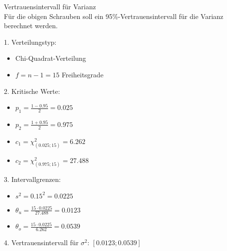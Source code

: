 \begin{example2}{Vertrauensintervall für Varianz}\\
Für die obigen Schrauben soll ein 95\%-Vertrauensintervall für die Varianz berechnet werden.

1. Verteilungstyp:
   \begin{itemize}
     \item Chi-Quadrat-Verteilung
     \item $f = n-1 = 15$ Freiheitsgrade
   \end{itemize}

2. Kritische Werte:
   \begin{itemize}
     \item $p_1 = \frac{1-0.95}{2} = 0.025$
     \item $p_2 = \frac{1+0.95}{2} = 0.975$
     \item $c_1 = \chi^2_{(0.025;15)} = 6.262$
     \item $c_2 = \chi^2_{(0.975;15)} = 27.488$
   \end{itemize}

3. Intervallgrenzen:
   \begin{itemize}
     \item $s^2 = 0.15^2 = 0.0225$
     \item $\theta_u = \frac{15 \cdot 0.0225}{27.488} = 0.0123$
     \item $\theta_o = \frac{15 \cdot 0.0225}{6.262} = 0.0539$
   \end{itemize}

4. Vertrauensintervall für $\sigma^2$: $[0.0123; 0.0539]$
\end{example2}

